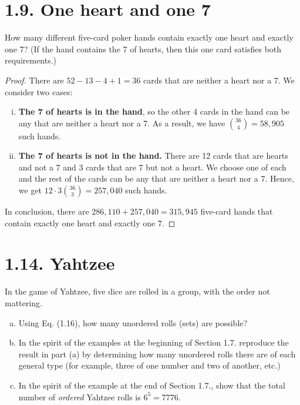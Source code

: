 \section*{1.9. One heart and one 7}
How many different five-card poker hands contain exactly one heart and exactly one 7? (If the hand
contains the 7 of hearts, then this one card satisfies both requirements.)

\vspace{1em}

\begin{proof}
    There are $52 - 13 - 4 + 1 = 36$ cards that are neither a heart nor a 7. We consider two cases:
    \begin{enumerate}[(i)]
        \item \textbf{The 7 of hearts is in the hand}, so the other 4 cards in the hand
            can be any that are neither a heart nor a 7. As a result, we have 
            $\binom{36}{4}= 58,905$ such hands.

        \item \textbf{The 7 of hearts is not in the hand.} There are 12 cards that are hearts and 
            not a 7 and 3 cards that are 7 but not a heart. We choose one of each and the rest of 
            the cards can be any that are neither a heart nor a 7. Hence, we get
            $12 \cdot 3 \binom{36}{3} = 257,040$ such hands.
    \end{enumerate}
    In conclusion, there are $286,110 + 257,040 = 315,945$ five-card hands that contain exactly
    one heart and exactly one 7.
\end{proof}


\section*{1.14. Yahtzee}
In the game of Yahtzee, five dice are rolled in a group, with the order not mattering.

\begin{enumerate}[(a)]
    \item Using Eq. (1.16), how many unordered rolls (sets) are possible?

    \item In the spirit of the examples at the beginning of Section 1.7. reproduce the
        result in part (a) by determining how many unordered rolls there are
        of each general type (for example, three of one number and two of another, etc.)

    \item In the spirit of the example at the end of Section 1.7., show that the total
        number of \emph{ordered} Yahtzee rolls is $6^5 = 7776$.
\end{enumerate}

